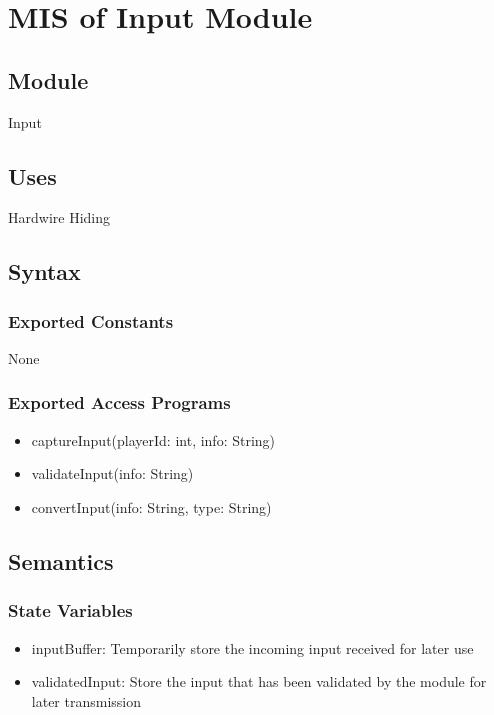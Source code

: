 \documentclass[12pt, titlepage]{article}
\begin{document}

\section{MIS of Input Module} 

\subsection{Module}
\hspace{1.5em}Input

\subsection{Uses}
\hspace{1.5em}Hardwire Hiding

\subsection{Syntax}

\subsubsection{Exported Constants}
\hspace{1.5em}None

\subsubsection{Exported Access Programs}

\begin{itemize}
\item captureInput(playerId: int, info: String)
\item validateInput(info: String)
\item convertInput(info: String, type: String)
\end{itemize}

\subsection{Semantics}

\subsubsection{State Variables}
\begin{itemize}
\item inputBuffer: Temporarily store the incoming input received for later use
\item validatedInput: Store the input that has been validated by the module for later transmission
\end{itemize}
\end{document}
